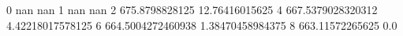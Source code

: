 0 nan nan
1 nan nan
2 675.8798828125 12.76416015625
4 667.5379028320312 4.42218017578125
6 664.5004272460938 1.38470458984375
8 663.11572265625 0.0
